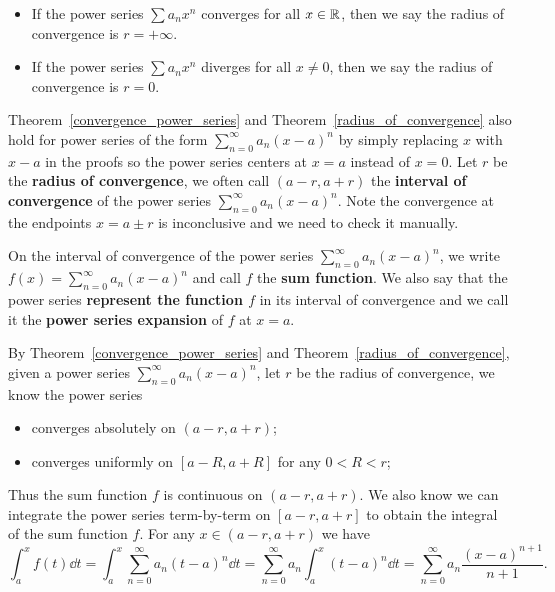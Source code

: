     \begin{remarkenv}
        \leavevmode
        \begin{itemize}
            \item If the power series $\sum a_n x^n$ converges for all $x\in \mathbb{R}$, then we say the radius of convergence is $r = +\infty$.
            \item If the power series $\sum a_n x^n$ diverges for all $x\neq 0$, then we say the radius of convergence is $r=0$.
        \end{itemize}
    \end{remarkenv}
    \begin{remarkenv}
        Theorem~\ref{convergence_power_series} and Theorem~\ref{radius_of_convergence} also hold for power series of the form $\displaystyle \sum_{n=0}^\infty a_n (x-a)^n$ by simply replacing $x$ with $x-a$ in the proofs so the power series centers at $x=a$ instead of $x=0$. Let $r$ be the \textbf{radius of convergence}, we often call $(a-r,a+r)$ the \textbf{interval of convergence} of the power series $\displaystyle \sum_{n=0}^\infty a_n (x-a)^n$. Note the convergence at the endpoints $x=a\pm r$ is inconclusive and we need to check it manually.
    \end{remarkenv}
    \begin{definitionenv}
        On the interval of convergence of the power series $\displaystyle \sum_{n=0}^\infty a_n (x-a)^n$, we write $f(x) = \displaystyle \sum_{n=0}^\infty a_n (x-a)^n$ and call $f$ the \textbf{sum function}. We also say that the power series \textbf{represent the function $f$} in its interval of convergence and we call it the \textbf{power series expansion} of $f$ at $x=a$. 
    \end{definitionenv}
    \begin{remarkenv}
        By Theorem~\ref{convergence_power_series} and Theorem~\ref{radius_of_convergence}, given a power series $\displaystyle \sum_{n=0}^\infty a_n (x-a)^n$, let $r$ be the radius of convergence, we know the power series
        \begin{itemize}
            \item converges absolutely on $(a-r,a+r)$;
            \item converges uniformly on $[a-R,a+R]$ for any $0<R<r$;
        \end{itemize}
        Thus the sum function $f$ is continuous on $(a-r,a+r)$. We also know we can integrate the power series term-by-term on $[a-r,a+r]$ to obtain the integral of the sum function $f$. For any $x\in(a-r,a+r)$ we have
        \[
        \int_a^x f(t) \dd t = \int_a^x \sum_{n=0}^\infty a_n (t-a)^n \dd t = \sum_{n=0}^\infty a_n \int_a^x (t-a)^n \dd t = \sum_{n=0}^\infty a_n \frac{(x-a)^{n+1}}{n+1}.
        \]
    \end{remarkenv}
